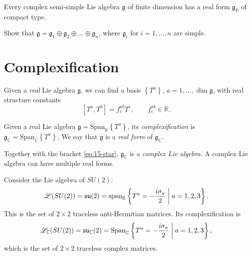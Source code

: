 \begin{theorem}[]
  Every complex semi-simple Lie algebra $\mathfrak{g}$ of finite dimension has a real form $\mathfrak{g}_{\mathbb{R}}$ of compact type.
\end{theorem}

\begin{exercise}
  Show that $\mathfrak{g} = \mathfrak{g}_1 \oplus \mathfrak{g}_2 \oplus \dots \oplus \mathfrak{g}_n$, where $\mathfrak{g}_i$ for $i = 1, \dots, n$ are simple.
\end{exercise}



\section{Complexification}%
\label{sec:complexification}

Given a \emph{real} Lie algebra $\mathfrak{g}$, we can find a basis $\left\{ T^{a} \right\}$, $a = 1, \dots, \dim \mathfrak{g}$, with real structure constants
\begin{equation}
  \label{eq:15-star}
  [T^{a}, T^{b}] = f^{ab}_{c} T^{c}, \qquad f^{ab}_{c} \in \mathbb{R}.
\end{equation}
\begin{definition}[]
  Given a real Lie algebra $\mathfrak{g} = \text{Span}_{\mathbb{R}} \left\{ T^{a} \right\}$, its \emph{complexification} is $\mathfrak{g}_{\mathbb{C}} = \text{Span}_{\mathbb{C}} \left\{ T^{a} \right\}$.
  We say that $\mathfrak{g}$ is a \emph{real form} of $\mathfrak{g}_\mathbb{C}$.
\end{definition}
Together with the bracket \eqref{eq:15-star}, $\mathfrak{g}_{\mathbb{C}}$ is a \emph{complex Lie algebra.}
A complex Lie algebra can have multiple real forms.
\begin{example}[]
  Consider the Lie algebra of $SU(2)$:
  \begin{equation}
    \mathscr{L}(SU(2)) = \mathfrak{su}(2) = \text{span}_{\mathbb{R}} \left\{ T^{a} = -\frac{i\sigma_{a}}{2}  \suchthat a = 1,2,3 \right\}.
  \end{equation}
  This is the set of $2 \times 2$ traceless anti-Hermitian matrices.
  Its complexification is
  \begin{equation}
    \mathscr{L}_{\mathbb{C}}(SU(2)) = \mathfrak{su}_{\mathbb{C}}(2) = \text{Span}_{\mathbb{C}}\left\{T^{a} = -\frac{i\sigma_{a}}{2} \suchthat a = 1,2,3\right\},
  \end{equation}
  which is the set of $2 \times 2$ traceless complex matrices.
\end{example}

